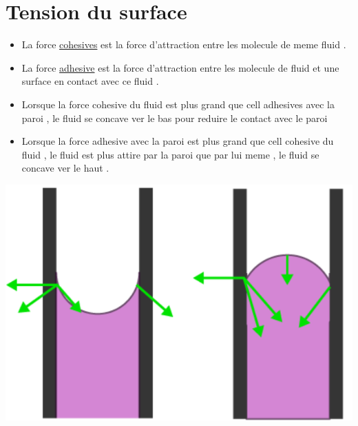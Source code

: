 \documentclass[12pt,oneside]{book}
\begin{document}
\section{Tension du surface}
\begin{itemize}
	\item La force \underline{cohesives} est la force d'attraction entre les molecule de meme fluid .
	\item La force \underline{adhesive} est la force d'attraction entre les molecule de fluid et une surface en contact avec ce fluid .
\end{itemize}
\begin{minipage}{0.5\linewidth}
	\begin{itemize}
		\item Lorsque la force cohesive du fluid est plus grand que cell adhesives avec la paroi , le fluid se concave ver le bas pour reduire le contact avec le paroi
		\item Lorsque la force adhesive avec la paroi est plus grand que cell cohesive du fluid , le fluid est plus attire par la paroi que par lui meme , le fluid se concave ver le haut .
	\end{itemize}
\end{minipage}
\begin{minipage}{0.5\linewidth}
	\includegraphics[width=\linewidth]{../pic/1103/4.png}
\end{minipage}
\pagebreak
\end{document}
